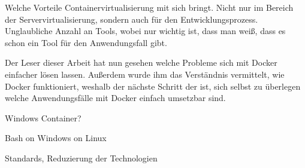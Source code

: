 

Welche Vorteile Containervirtualisierung mit sich bringt. Nicht nur im Bereich der Servervirtualisierung, sondern auch für den Entwicklungsprozess.
Unglaubliche Anzahl an Tools, wobei nur wichtig ist, dass man weiß, dass es schon ein Tool für den Anwendungsfall gibt.

Der Leser dieser Arbeit hat nun gesehen welche Probleme sich mit Docker einfacher lösen lassen. Außerdem wurde ihm das Verständnis vermittelt, wie Docker funktioniert, weshalb der nächste Schritt der ist, sich selbst zu überlegen welche Anwendungsfälle mit Docker einfach umsetzbar sind.

Windows Container?

Bash on Windows on Linux

Standards, Reduzierung der Technologien
